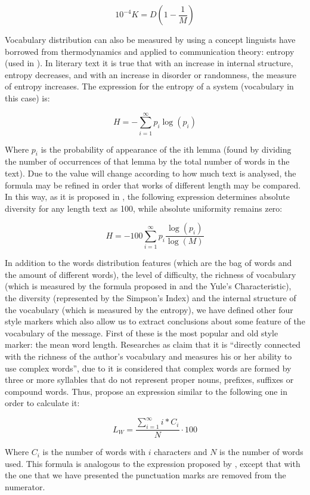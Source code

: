 $$
10^{-4}K=D\left(1-\frac{1}{M}\right)
$$

Vocabulary distribution can also be measured by using a concept linguists have borrowed from thermodynamics and applied to communication theory: entropy (used in \cite{holmes1985analysis}). In literary text it is true that with an increase in internal structure, entropy decreases, and with an increase in disorder or randomness, the measure of entropy increases. The expression for the entropy of a system (vocabulary in this case) is:

$$
H = -\sum_{i=1}^{\infty} p_i\log(p_i)
$$

Where $p_i$ is the probability of appearance of the ith lemma (found by dividing the number of occurrences of that lemma by the total number of words in the text). Due to the value will change according to how much text is analysed, the formula may be refined in order that works of different length may be compared. In this way, as it is proposed in \cite{holmes1985analysis}, the following expression determines absolute diversity for any length text as 100, while absolute uniformity remains zero:

$$
H=-100\sum_{i = 1}^{\infty}p_i\frac{\log(p_i)}{\log(M)}
$$

In addition to the words distribution features (which are the bag of words and the amount of different words), the level of difficulty, the richness of vocabulary (which is measured by the formula proposed in \cite{honore1979some} and the Yule's Characteristic), the diversity (represented by the Simpson's Index) and the internal structure of the vocabulary (which is measured by the entropy), we have defined other four style markers which also allow us to extract conclusions about some feature of the vocabulary of the message. First of these is the most popular and old style marker: the mean word length. Researches as \cite{ril2014determination} claim that it is ``directly connected with the richness of the author's vocabulary and measures his or her ability to use complex words'', due to it is considered that complex words are formed by three or more syllables that do not represent proper nouns, prefixes, suffixes or compound words. Thus, \cite{ril2014determination} propose an expression similar to the following one in order to calculate it:

$$
L_W = \frac{\sum_{i=1}^{\infty}i*C_i}{N}\cdot 100
$$

Where $C_i$ is the number of words with $i$ characters and $N$ is the number of words used. This formula is analogous to the expression proposed by \cite{ril2014determination}, except that with the one that we have presented the punctuation marks are removed from the numerator.

